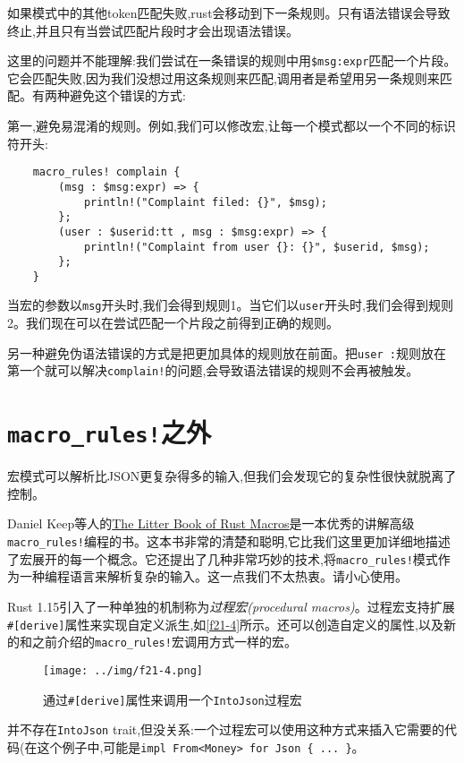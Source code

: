 如果模式中的其他token匹配失败,rust会移动到下一条规则。只有语法错误会导致终止,并且只有当尝试匹配片段时才会出现语法错误。

这里的问题并不能理解:我们尝试在一条错误的规则中用\texttt{\$msg:expr}匹配一个片段。它会匹配失败,因为我们没想过用这条规则来匹配,调用者是希望用另一条规则来匹配。有两种避免这个错误的方式:

第一,避免易混淆的规则。例如,我们可以修改宏,让每一个模式都以一个不同的标识符开头:
\begin{verbatim}
    macro_rules! complain {
        (msg : $msg:expr) => {
            println!("Complaint filed: {}", $msg);
        };
        (user : $userid:tt , msg : $msg:expr) => {
            println!("Complaint from user {}: {}", $userid, $msg);
        };
    }
\end{verbatim}

当宏的参数以\texttt{msg}开头时,我们会得到规则1。当它们以\texttt{user}开头时,我们会得到规则2。我们现在可以在尝试匹配一个片段之前得到正确的规则。

另一种避免伪语法错误的方式是把更加具体的规则放在前面。把\texttt{user :}规则放在第一个就可以解决\texttt{complain!}的问题,会导致语法错误的规则不会再被触发。

\section{\texttt{macro\_rules!}之外}
宏模式可以解析比JSON更复杂得多的输入,但我们会发现它的复杂性很快就脱离了控制。

Daniel Keep等人的\href{https://danielkeep.github.io/tlborm/book/}{The Litter Book of Rust Macros}是一本优秀的讲解高级\texttt{macro\_rules!}编程的书。这本书非常的清楚和聪明,它比我们这里更加详细地描述了宏展开的每一个概念。它还提出了几种非常巧妙的技术,将\texttt{macro\_rules!}模式作为一种编程语言来解析复杂的输入。这一点我们不太热衷。请小心使用。

Rust 1.15引入了一种单独的机制称为\emph{过程宏(procedural macros)}。过程宏支持扩展\texttt{\#[derive]}属性来实现自定义派生,如\autoref{f21-4}所示。还可以创造自定义的属性,以及新的和之前介绍的\texttt{macro\_rules!}宏调用方式一样的宏。

\begin{figure}[htbp]
    \centering
    \texttt{[image: ../img/f21-4.png]}
    \caption{通过\texttt{\#[derive]}属性来调用一个\texttt{IntoJson}过程宏}
    \label{f21-4}
\end{figure}

并不存在\texttt{IntoJson} trait,但没关系:一个过程宏可以使用这种方式来插入它需要的代码(在这个例子中,可能是\texttt{impl From<Money> for Json \{ ... \}}。

